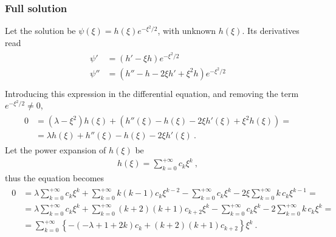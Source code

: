 \documentclass[letterpaper,10pt,english]{jupyterBook}
\begin{document}
\subsubsection*{Full solution}

\sphinxAtStartPar
Let the solution be \(\psi(\xi) = h(\xi) e^{-\xi^2/2}\), with unknown \(h(\xi)\). Its derivatives read
\begin{equation*}
\begin{split}\begin{aligned}
  \psi'  & = \left( h' - \xi h \right) e^{-\xi^2/2} \\
  \psi'' & = \left( h'' - h - 2 \xi h' + \xi^2 h \right) e^{-\xi^2/2} \\
\end{aligned}\end{split}
\end{equation*}
\sphinxAtStartPar
Introducing this expression in the differential equation, and removing the term \(e^{-\xi^2/2} \ne 0\),
\begin{equation*}
\begin{split}\begin{aligned}
  0 
  & = ( \lambda - \xi^2 ) h(\xi) + ( h''(\xi) - h(\xi) - 2 \xi h'(\xi) + \xi^2 h(\xi) ) = \\
  & = \lambda h(\xi) + h''(\xi) - h(\xi) - 2 \xi h'(\xi)  \ .
\end{aligned}\end{split}
\end{equation*}
\sphinxAtStartPar
Let the power expansion of \(h(\xi)\) be
\begin{equation*}
\begin{split}h(\xi) = \sum_{k=0}^{+\infty} c_k \xi^k \ ,\end{split}
\end{equation*}
\sphinxAtStartPar
thus the equation becomes
\begin{equation*}
\begin{split}\begin{aligned}
 0 
 & = \lambda \sum_{k=0}^{+\infty} c_k \xi^k + \sum_{k=0}^{+\infty} k (k-1) c_k \xi^{k-2} - \sum_{k=0}^{+\infty} c_k \xi^k - 2 \xi \sum_{k=0}^{+\infty} k \, c_k \xi^{k-1} = \\
 & = \lambda \sum_{k=0}^{+\infty} c_k \xi^k + \sum_{k=0}^{+\infty} (k+2) (k+1) c_{k+2} \xi^{k} - \sum_{k=0}^{+\infty} c_k \xi^k - 2 \sum_{k=0}^{+\infty} k \, c_k \xi^{k} = \\
 & = \sum_{k=0}^{+\infty} \left\{ - \left( - \lambda + 1 + 2k \right) c_k + \left( k + 2 \right) \left( k + 1 \right) c_{k+2} \right\} \xi^k \ .
\end{aligned}\end{split}
\end{equation*}
\end{document}
